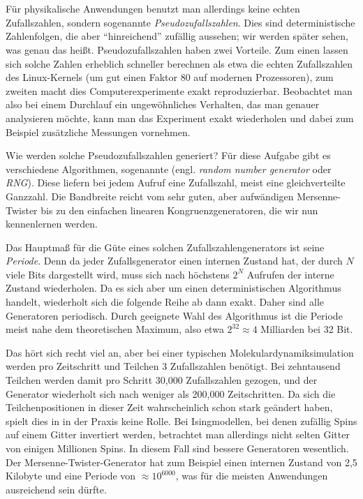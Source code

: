 \section{}

Für physikalische Anwendungen benutzt man allerdings keine echten
Zufallszahlen, sondern sogenannte \emph{Pseudozufallszahlen}. Dies
sind deterministische Zahlenfolgen, die aber "`hinreichend"' zufällig
aussehen; wir werden später sehen, was genau das
heißt. Pseudozufallszahlen haben zwei Vorteile. Zum einen lassen sich
solche Zahlen erheblich schneller berechnen als etwa die echten
Zufallszahlen des Linux-Kernels (um gut einen Faktor 80 auf modernen
Prozessoren), zum zweiten macht dies Computerexperimente exakt
reproduzierbar. Beobachtet man also bei einem Durchlauf ein
ungewöhnliches Verhalten, das man genauer analysieren möchte, kann man
das Experiment exakt wiederholen und dabei zum Beispiel zusätzliche
Messungen vornehmen.

Wie werden solche Pseudozufallszahlen generiert? Für diese Aufgabe
gibt es verschiedene Algorithmen, sogenannte
\emph{} (engl. \emph{random number
  generator} oder \emph{RNG}). Diese liefern bei jedem Aufruf eine
Zufallszahl, meist eine gleichverteilte Ganzzahl. Die Bandbreite
reicht vom sehr guten, aber aufwändigen Mersenne-Twister bis zu den
einfachen linearen Kongruenzgeneratoren, die wir nun kennenlernen
werden.

Das Hauptmaß für die Güte eines solchen Zufallszahlengenerators ist
seine \emph{Periode}. Denn da jeder Zufallsgenerator einen internen
Zustand hat, der durch $N$ viele Bits dargestellt wird, muss sich nach
höchstens $2^N$ Aufrufen der interne Zustand wiederholen. Da es sich
aber um einen deterministischen Algorithmus handelt, wiederholt sich
die folgende Reihe ab dann exakt. Daher sind alle Generatoren
periodisch. Durch geeignete Wahl des Algorithmus ist die Periode meist
nahe dem theoretischen Maximum, also etwa $2^{32}\approx 4$ Milliarden
bei 32 Bit.

Das hört sich recht viel an, aber bei einer typischen
Molekulardynamiksimulation werden pro Zeitschritt und Teilchen 3
Zufallszahlen benötigt.  Bei zehntausend Teilchen werden damit pro
Schritt 30,000 Zufallszahlen gezogen, und der Generator wiederholt
sich nach weniger als 200,000 Zeitschritten. Da sich die
Teilchenpositionen in dieser Zeit wahrscheinlich schon stark geändert
haben, spielt dies in in der Praxis keine Rolle.  Bei Isingmodellen,
bei denen zufällig Spins auf einem Gitter invertiert werden,
betrachtet man allerdings nicht selten Gitter von einigen Millionen
Spins. In diesem Fall sind bessere Generatoren wesentlich.  Der
Mersenne-Twister-Generator hat zum Beispiel einen internen Zustand von
2,5 Kilobyte und eine Periode von $\approx 10^{6000}$, was für die
meisten Anwendungen ausreichend sein dürfte.

